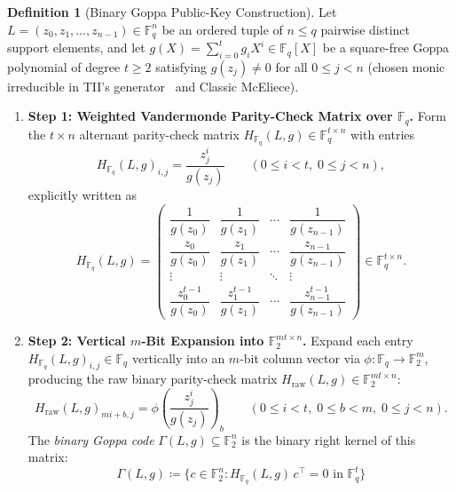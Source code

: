 \documentclass[11pt,a4paper]{article}
\theoremstyle{definition}
\newtheorem{definition}{Definition}
\theoremstyle{remark}
\newcommand{\F}{\mathbb{F}}
\begin{document}
\begin{definition}[Binary Goppa Public-Key Construction]
\label{def:goppa}
Let $L = (z_0, z_1, \dots, z_{n-1}) \in \F_q^n$ be an ordered tuple of $n \le q$ pairwise distinct support elements, and let $g(X) = \sum_{i=0}^t g_i X^i \in \F_q[X]$ be a square-free Goppa polynomial of degree $t \ge 2$ satisfying $g(z_j) \neq 0$ for all $0 \le j < n$ (chosen monic irreducible in TII's generator~\cite{KE23} and Classic McEliece).
\begin{enumerate}[leftmargin=2em]
    \item \textbf{Step 1: Weighted Vandermonde Parity-Check Matrix over $\F_q$.}
    Form the $t \times n$ alternant parity-check matrix $H_{\F_q}(L, g) \in \F_q^{t \times n}$ with entries
    \begin{equation}
    \label{eq:h-fq}
        H_{\F_q}(L, g)_{i, j} = \frac{z_j^i}{g(z_j)} \qquad (0 \le i < t,\; 0 \le j < n),
    \end{equation}
    explicitly written as
    \[
        H_{\F_q}(L, g) =
        \begin{pmatrix}
            \dfrac{1}{g(z_0)} & \dfrac{1}{g(z_1)} & \cdots & \dfrac{1}{g(z_{n-1})} \\[0.8em]
            \dfrac{z_0}{g(z_0)} & \dfrac{z_1}{g(z_1)} & \cdots & \dfrac{z_{n-1}}{g(z_{n-1})} \\[0.4em]
            \vdots & \vdots & \ddots & \vdots \\[0.4em]
            \dfrac{z_0^{t-1}}{g(z_0)} & \dfrac{z_1^{t-1}}{g(z_1)} & \cdots & \dfrac{z_{n-1}^{t-1}}{g(z_{n-1})}
        \end{pmatrix} \in \F_q^{t \times n}.
    \]
    \item \textbf{Step 2: Vertical $m$-Bit Expansion into $\F_2^{mt \times n}$.}
    Expand each entry $H_{\F_q}(L, g)_{i, j} \in \F_q$ vertically into an $m$-bit column vector via $\phi: \F_q \to \F_2^m$, producing the raw binary parity-check matrix $H_{\text{raw}}(L, g) \in \F_2^{mt \times n}$:
    \begin{equation}
    \label{eq:h-raw}
        H_{\text{raw}}(L, g)_{mi + b, j} = \phi\!\left(\frac{z_j^i}{g(z_j)}\right)_{\!b} \qquad (0 \le i < t,\; 0 \le b < m,\; 0 \le j < n).
    \end{equation}
    The \emph{binary Goppa code} $\Gamma(L, g) \subseteq \F_2^n$ is the binary right kernel of this matrix:
    \begin{equation}
    \label{eq:goppa-kernel}
        \Gamma(L, g) \coloneqq \big\{c \in \F_2^n : H_{\F_q}(L, g)\,c^\top = 0 \text{ in } \F_q^t\big\}

\end{equation}
\end{enumerate}
\end{definition}
\end{document}
